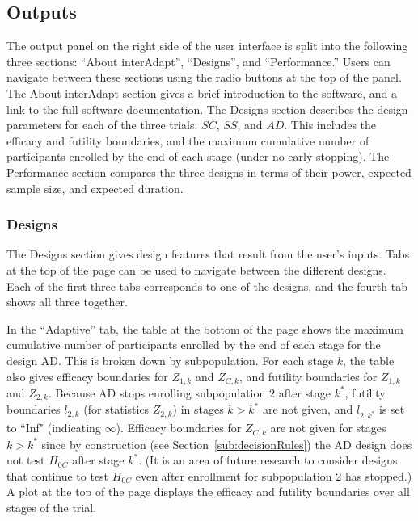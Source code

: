 \documentclass[article]{jss}
\begin{document}
\subsection{Outputs}
\label{sub:outputs}

The output panel on the right side of the user interface is split into the following three sections: ``About interAdapt'', ``Designs'', and ``Performance.'' Users can navigate between these sections using the radio buttons at the top of the panel. The About interAdapt section gives a brief introduction to the software, and a link to the full software documentation. The Designs section describes the design parameters for each of the three trials: $SC$, $SS$, and $AD$. This includes the efficacy and futility boundaries, and the maximum cumulative number of participants enrolled by the end of each stage (under no early stopping). The Performance section compares the three designs in terms of their power, expected sample size, and expected duration. 

\subsubsection{Designs}
\label{sub:design}

The Designs section gives design features that result from the user's inputs. Tabs at the top of the page can be used to navigate between the different designs. Each of the first three tabs  corresponds to one of the designs, and the fourth tab shows all three together.

In the ``Adaptive'' tab, the table at the bottom of the page shows the maximum cumulative number of participants enrolled by the end of each stage for the design AD. This is broken down by subpopulation. For each stage $k$, the table also gives efficacy boundaries for $Z_{1,k}$ and $Z_{C,k}$, and futility boundaries for $Z_{1,k}$ and $Z_{2,k}$. Because AD  stops enrolling subpopulation $2$ after stage $k^*$, futility boundaries $l_{2,k}$ (for statistics $Z_{2,k}$) in stages $k>k^*$  are not given, and $l_{2,k^*}$ is set to ``Inf" (indicating $\infty$). %
Efficacy boundaries for $Z_{C,k}$ are not given for stages $k>k^*$ since by construction (see Section~\ref{sub:decisionRules}) the AD design does not test $H_{0C}$ after stage $k^*$. (It is an area of future research to consider designs that continue to test $H_{0C}$ even after enrollment for subpopulation 2 has stopped.) A plot at the top of the page displays the efficacy and futility boundaries over all stages of the trial.
\end{document}

